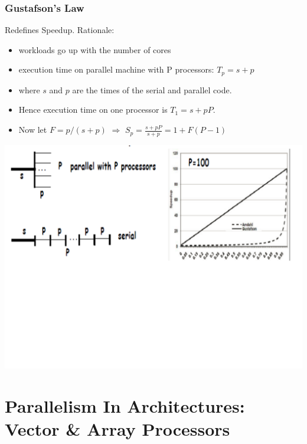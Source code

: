 \documentclass{beamer}
\newcommand{\emp}[1]{\textcolor{DikuRed}{ #1}}
\begin{document}
\begin{frame}[fragile,t]
\frametitle{Gustafson's Law}

Redefines Speedup. Rationale:
\begin{itemize}
    \item workloads go up with the number of cores
    \item execution time on parallel machine with P processors: $T_p = s + p$
    \item where $s$ and $p$ are the times of the serial and parallel code.
    \item Hence execution time on one processor is $T_1 = s + pP$.
    \item Now let $F = p/(s+p)$ $\Rightarrow$ 
            \emp{$S_p = \frac{s+pP}{s+p} = 1 + F(P-1)$}
\end  {itemize}
\vspace{2ex}

\includegraphics[width=59ex]{Ch1Figs/AmdhalGustaff}


\end{frame}



\section{Parallelism In Architectures: Vector \& Array Processors}

\begin{frame}[fragile]
	\tableofcontents[currentsection]
\end{frame}
\end{document}
